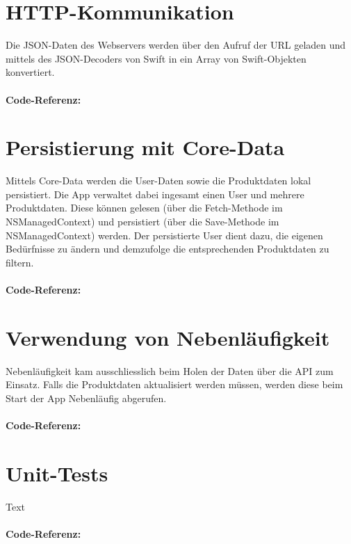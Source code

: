 \documentclass[12pt,titlepage]{article}
\begin{document}
\section*{HTTP-Kommunikation}
Die JSON-Daten des Webservers werden über den Aufruf der  URL geladen und mittels des JSON-Decoders von Swift in ein Array von Swift-Objekten konvertiert.\\
\\
\textbf{Code-Referenz: }\\ 

\section*{Persistierung mit Core-Data}
Mittels Core-Data werden die User-Daten sowie die Produktdaten lokal persistiert. Die App verwaltet dabei ingesamt einen User und mehrere Produktdaten. Diese können gelesen (über die Fetch-Methode im NSManagedContext) und persistiert (über die Save-Methode im NSManagedContext) werden. Der persistierte User dient dazu, die eigenen Bedürfnisse zu ändern und demzufolge die entsprechenden Produktdaten zu filtern.\\
\\
\textbf{Code-Referenz: }\\ 


\section*{Verwendung von Nebenläufigkeit}
Nebenläufigkeit kam ausschliesslich beim Holen der Daten über die API zum Einsatz. Falls die Produktdaten aktualisiert werden müssen, werden diese beim Start der App Nebenläufig abgerufen.\\
\\
\textbf{Code-Referenz: }\\ 


\section*{Unit-Tests}
Text\\
\\
\textbf{Code-Referenz: }\\ 
\end{document}
